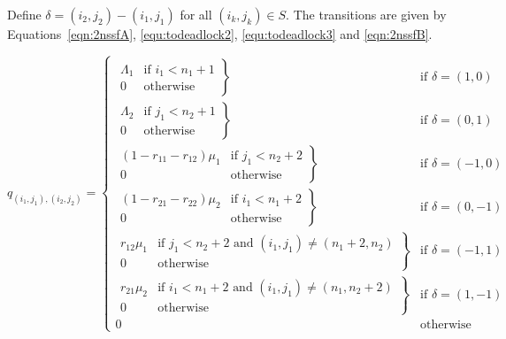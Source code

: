 \documentclass{article}
\numberwithin{equation}{section}
\begin{document}
Define $\delta = (i_2, j_2) - (i_1, j_1)$ for all $(i_k, j_k) \in S$. The transitions are given by Equations~\ref{eqn:2nssfA}, \ref{equ:todeadlock2}, \ref{equ:todeadlock3} and \ref{eqn:2nssfB}.

\begin{equation}\label{eqn:2nssfA}
  q_{(i_1, j_1),(i_2, j_2)} = \left\{
  \begin{array}{rr}
    \left. \begin{array}{rr}
      \Lambda_1 & \text{if } i_1 < n_1 + 1 \\
      0 & \text{otherwise}
    \end{array} \right\} & \text{if } \delta = (1, 0) \\
    \left. \begin{array}{rr}
      \Lambda_2 & \text{if } j_1 < n_2 + 1 \\
      0 & \text{otherwise}
    \end{array} \right\} & \text{if } \delta = (0, 1) \\
    \left. \begin{array}{rr}
      (1 - r_{11} - r_{12})\mu_1 & \text{if } j_1 < n_2 + 2 \\
      0 & \text{otherwise}
    \end{array} \right\} & \text{if } \delta = (-1, 0) \\
    \left. \begin{array}{rr}
      (1 - r_{21} - r_{22})\mu_2 & \text{if } i_1 < n_1 + 2 \\
      0 & \text{otherwise}
    \end{array} \right\} & \text{if } \delta = (0, -1) \\
    \left. \begin{array}{rr}
      r_{12}\mu_1 & \text{if } j_1 < n_2 + 2 \text{ and } (i_1, j_1) \neq (n_1 + 2, n_2) \\
      0 & \text{otherwise}
    \end{array} \right\} & \text{if } \delta = (-1, 1) \\
    \left. \begin{array}{rr}
      r_{21}\mu_2 & \text{if } i_1 < n_1 + 2 \text{ and } (i_1, j_1) \neq (n_1, n_2 + 2) \\
      0 & \text{otherwise}
    \end{array} \right\} & \text{if } \delta = (1, -1) \\
    0 & \text{otherwise}
  \end{array} \right.
\end{equation}
\end{document}

